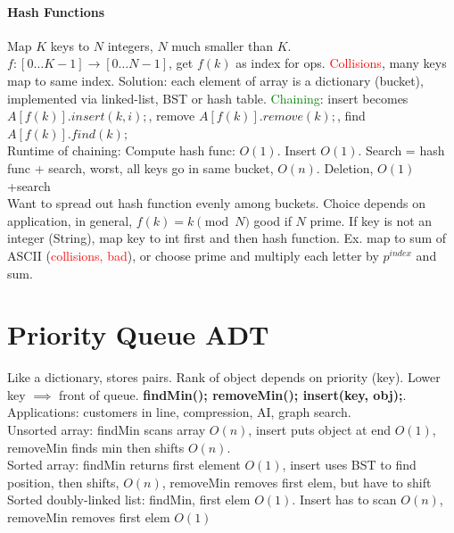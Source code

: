 \paragraph{Hash Functions}
Map $K$ keys to $N$ integers, $N$ much smaller than $K$. $f:[0\ldots K-1]\to [0 \ldots N-1]$, get $f(k)$ as index for ops. \textcolor{Red}{Collisions}, many keys map to same index. Solution: each element of array is a dictionary (bucket), implemented via linked-list, BST or hash table. \textcolor{Green}{Chaining}: insert becomes $A[f(k)].insert(k,i);$, remove $A[f(k)].remove(k);$, find $A[f(k)].find(k);$
\\ Runtime of chaining: Compute hash func: $O(1)$. Insert $O(1)$. Search = hash func + search, worst, all keys go in same bucket, $O(n)$. Deletion, $O(1)$+search
\\ Want to spread out hash function evenly among buckets. Choice depends on application, in general, $f(k) = k \pmod{N}$ good if $N$ prime. If key is not an integer (String), map key to int first and then hash function. Ex. map to sum of ASCII (\textcolor{Red}{collisions, bad}), or choose prime and multiply each letter by $p^{index}$ and sum.
\color{LimeGreen}
\section{Priority Queue ADT}
Like a dictionary, stores pairs. Rank of object depends on priority (key). Lower key $\implies$ front of queue. \textbf{findMin(); removeMin(); insert(key, obj);}. Applications: customers in line, compression, AI, graph search.
\\ Unsorted array: findMin scans array $O(n)$, insert puts object at end $O(1)$, removeMin finds min then shifts $O(n)$.
\\Sorted array: findMin returns first element $O(1)$, insert uses BST to find position, then shifts, $O(n)$, removeMin removes first elem, but have to shift
\\ Sorted doubly-linked list: findMin, first elem $O(1)$. Insert has to scan $O(n)$, removeMin removes first elem $O(1)$
